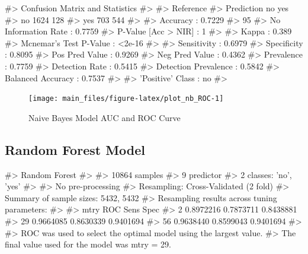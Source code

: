 \begin{Schunk}
\begin{Soutput}
#> Confusion Matrix and Statistics
#> 
#>           Reference
#> Prediction   no  yes
#>        no  1624  128
#>        yes  703  544
#>                                           
#>                Accuracy : 0.7229          
#>                  95%
#>     No Information Rate : 0.7759          
#>     P-Value [Acc > NIR] : 1               
#>                                           
#>                   Kappa : 0.389           
#>  Mcnemar's Test P-Value : <2e-16          
#>                                           
#>             Sensitivity : 0.6979          
#>             Specificity : 0.8095          
#>          Pos Pred Value : 0.9269          
#>          Neg Pred Value : 0.4362          
#>              Prevalence : 0.7759          
#>          Detection Rate : 0.5415          
#>    Detection Prevalence : 0.5842          
#>       Balanced Accuracy : 0.7537          
#>                                           
#>        'Positive' Class : no              
#> 
\end{Soutput}
\end{Schunk}

\begin{Schunk}
\begin{figure}[H]

{\centering \texttt{[image: main\_files/figure-latex/plot\_nb\_ROC-1]} 

}

\caption[Naive Bayes Model AUC and ROC Curve]{Naive Bayes Model AUC and ROC Curve}\label{fig:plot_nb_ROC}
\end{figure}
\end{Schunk}

\hypertarget{random-forest-model}{%
\subsection{Random Forest Model}\label{random-forest-model}}

\begin{Schunk}
\begin{Soutput}
#> Random Forest 
#> 
#> 10864 samples
#>     9 predictor
#>     2 classes: 'no', 'yes' 
#> 
#> No pre-processing
#> Resampling: Cross-Validated (2 fold) 
#> Summary of sample sizes: 5432, 5432 
#> Resampling results across tuning parameters:
#> 
#>   mtry  ROC        Sens       Spec     
#>    2    0.8972216  0.7873711  0.8438881
#>   29    0.9664085  0.8630339  0.9401694
#>   56    0.9638440  0.8599043  0.9401694
#> 
#> ROC was used to select the optimal model using the largest value.
#> The final value used for the model was mtry = 29.
\end{Soutput}
\end{Schunk}


